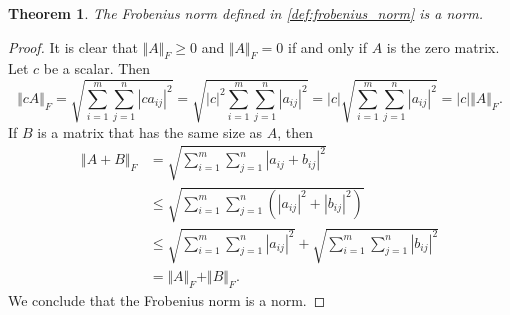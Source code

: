 \documentclass[12pt]{article}
\newtheorem{theorem}{Theorem}[subsection]
\theoremstyle{definition}
\begin{document}
\begin{theorem}
    The Frobenius norm defined in \ref{def:frobenius_norm} is a norm.
\end{theorem}
\begin{proof}
    It is clear that $\Vert A\Vert_F \geq 0$ and $\Vert A\Vert_F = 0$ if and only if $A$ is the zero matrix. Let $c$ be a scalar. Then
    \[ \Vert cA\Vert_F 
    = \sqrt{\sum_{i=1}^m \sum_{j=1}^n |ca_{ij}|^2}
    = \sqrt{|c|^2\sum_{i=1}^m \sum_{j=1}^n |a_{ij}|^2}
    = |c| \sqrt{\sum_{i=1}^m \sum_{j=1}^n |a_{ij}|^2}
    = |c| \Vert A\Vert_F.
    \]
    If $B$ is a matrix that has the same size as $A$, then
    \[
    \begin{aligned}
        \Vert A + B\Vert_F
        &= \sqrt{\sum_{i=1}^m \sum_{j=1}^n |a_{ij} + b_{ij}|^2} \\
        &\leq \sqrt{\sum_{i=1}^m \sum_{j=1}^n (|a_{ij}|^2 + |b_{ij}|^2)} \\
        &\leq \sqrt{\sum_{i=1}^m \sum_{j=1}^n |a_{ij}|^2} + \sqrt{\sum_{i=1}^m \sum_{j=1}^n |b_{ij}|^2} \\
        &= \Vert A\Vert_F + \Vert B\Vert_F.
    \end{aligned}
    \]
    We conclude that the Frobenius norm is a norm.
\end{proof}
\end{document}
